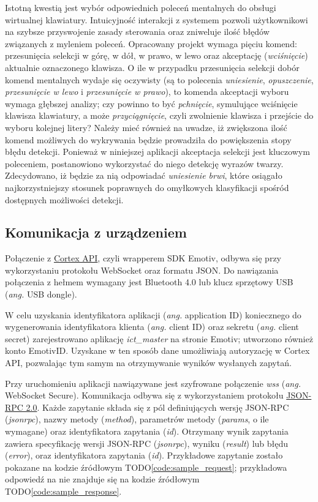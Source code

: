 \documentclass[skorowidz,skroty]{dyplomWEZUT}
\begin{document}
Istotną kwestią jest wybór odpowiednich poleceń mentalnych do obsługi wirtualnej klawiatury. Intuicyjność interakcji z systemem pozwoli użytkownikowi na szybsze przyswojenie zasady sterowania oraz zniweluje ilość błędów związanych z myleniem poleceń. Opracowany projekt wymaga pięciu komend: przesunięcia selekcji w górę, w dół, w prawo, w lewo oraz akceptację (\textit{wciśnięcie}) aktualnie oznaczonego klawisza. O ile w przypadku przesunięcia selekcji dobór komend mentalnych wydaje się oczywisty (są to polecenia \textit{uniesienie}, \textit{opuszczenie}, \textit{przesunięcie w lewo} i \textit{przesunięcie w prawo}), to komenda akceptacji wyboru wymaga głębszej analizy; czy powinno to być \textit{pchnięcie}, symulujące wciśnięcie klawisza klawiatury, a może \textit{przyciągnięcie}, czyli zwolnienie klawisza i przejście do wyboru kolejnej litery? Należy mieć również na uwadze, iż zwiększona ilość komend możliwych do wykrywania będzie prowadziła do powiększenia stopy błędu detekcji. Ponieważ w niniejszej aplikacji akceptacja selekcji jest kluczowym poleceniem, postanowiono wykorzystać do niego detekcję wyrazów twarzy. Zdecydowano, iż będzie za nią odpowiadać \textit{uniesienie brwi}, które osiągało najkorzystniejszy stosunek poprawnych do omyłkowych klasyfikacji spośród dostępnych możliwości detekcji. 


\subsection{Komunikacja z urządzeniem}
Połączenie z \href{https://emotiv.gitbook.io/cortex-api/}{Cortex API}, czyli wrapperem SDK Emotiv, odbywa się przy wykorzystaniu protokołu WebSocket oraz formatu JSON. Do nawiązania połączenia z hełmem wymagany jest Bluetooth 4.0 lub klucz sprzętowy USB (\textit{ang.} USB dongle).

W celu uzyskania identyfikatora aplikacji (\textit{ang.} application ID) koniecznego do wygenerowania identyfikatora klienta (\textit{ang.} client ID) oraz sekretu (\textit{ang.} client secret) zarejestrowano aplikację \textit{ict\_master} na stronie Emotiv; utworzono również konto EmotivID. Uzyskane w ten sposób dane umożliwiają autoryzację w Cortex API, pozwalając tym samym na otrzymywanie wyników wysłanych zapytań.

Przy uruchomieniu aplikacji nawiązywane jest szyfrowane połączenie \textit{wss} (\textit{ang.} WebSocket Secure). Komunikacja odbywa się z wykorzystaniem protokołu \href{https://www.jsonrpc.org/specification}{JSON-RPC 2.0}. Każde zapytanie składa się z pól definiujących wersję JSON-RPC (\textit{jsonrpc}), nazwy metody (\textit{method}), parametrów metody (\textit{params}, o ile wymagane) oraz identyfikatora zapytania (\textit{id}). Otrzymany wynik zapytania zawiera specyfikację wersji JSON-RPC (\textit{jsonrpc}), wyniku (\textit{result}) lub błędu (\textit{error}), oraz identyfikatora zapytania (\textit{id}). Przykładowe zapytanie zostało pokazane na kodzie źródłowym TODO\ref{code:sample_request}; przykładowa odpowiedź na nie znajduje się na kodzie źródłowym TODO\ref{code:sample_response}.
\end{document}
